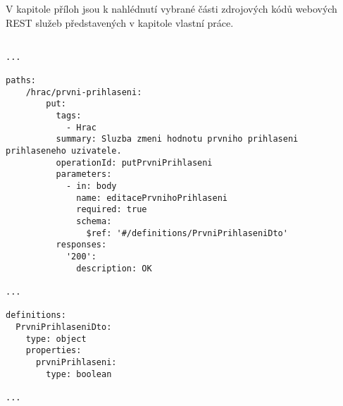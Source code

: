 \documentclass[12pt]{article}
\begin{document}

V kapitole příloh jsou k nahlédnutí vybrané části zdrojových kódů
webových REST služeb představených v kapitole vlastní práce.


\begin{lstlisting}

...

paths:
    /hrac/prvni-prihlaseni:
        put:
          tags:
            - Hrac
          summary: Sluzba zmeni hodnotu prvniho prihlaseni prihlaseneho uzivatele.
          operationId: putPrvniPrihlaseni
          parameters:
            - in: body
              name: editacePrvnihoPrihlaseni
              required: true
              schema:
                $ref: '#/definitions/PrvniPrihlaseniDto'
          responses:
            '200':
              description: OK
              
...

definitions:
  PrvniPrihlaseniDto:
    type: object
    properties:
      prvniPrihlaseni:
        type: boolean

...

\end{lstlisting}

\end{document}
